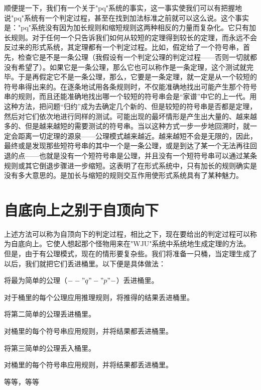 顺便提一下，我们有一个关于"pq"系统的事实，这一事实使我们可以有把握地说"pq"系统有一个判定过程，甚至在找到加法标准之前就可以这么说。这个事实是："pq"系统没有因为加长规则和缩短规则这两种相反的力量而复杂化。它只有加长规则。对于任何一个只告诉我们如何从较短的定理得到较长的定理，而永远不会反过来的形式系统，其定理都有一个判定过程。比如，假定给了一个符号串，首先，检查它是不是一条公理（我假设有一个判定公理的判定过程——否则一切就都没有希望了）。如果它是一条公理，那么它也可以称作是一条定理，这个测试就完毕。于是再假定它不是一条公理，那么，它要是一条定理，就一定是从一个较短的符号串得出来的。在逐条地试用各条规则时，不仅能准确地找出可能产生那个符号串的规则，而且还能准确地找出哪一个较短的符号串会是“家谱”中它的上一代。用这种方法，把问题“归约”成为去确定几个新的、但是较短的符号串是否都是定理，然后对它们依次地进行同样的测试。可能出现的最坏情形是产生出大量的、越来越多的、但是越来越短的需要测试的符号串。当以这种方式一步一步地回溯时，就一定会距离一切定理的源泉——公理模式越来越近。越来越短不会是无限的，因此，最终或是发现那些短符号串的其中一个是一条公理，或是到达了某一个无法再往回退的点——也就是没有一个短符号串是公理，并且没有一个短符号串可以通过某条规则或其它倒退步骤进一步缩短。这表明了在形式系统中，只有加长的规则确实是没有多大意思的。是加长与缩短的规则交互作用使形式系统具有了某种魅力。

\section{自底向上之别于自顶向下}

上述方法可以称为自顶向下的判定过程，相比之下，现在要给出的判定过程可以称为自底向上。它使人想起那个怪物用来在"WJU"系统中系统地生成定理的方法。但是，由于有公理模式，现在的情形要复杂些。我们将准备一只桶，当定理生成了以后，我们就把它们丢进桶里。以下便是具体做法：
\begin{description}[labelwidth=2\ccwd, labelsep=0pt,
  align=fillright, leftmargin=4\ccwd]
\item[(1a)]将最为简单的公理（$--"q"-"p"-$）丢进桶里。
\item[(1b)]对于桶里的每个公理应用推理规则，将推得的结果丢进桶里。
\item[(2a)]将第二简单的公理丢进桶里。
\item[(2b)]对桶里的每个符号串应用规则，并将结果都丢进桶里。
\item[(3a)]将第三简单的公理丢入桶里。
\item[(3b)]对桶里的每个符号串应用规则，并将结果都丢进桶里。
\item[]等等，等等
\end{description}

